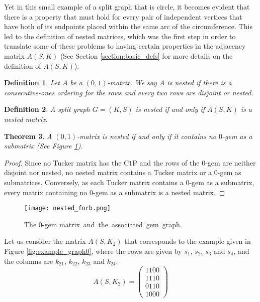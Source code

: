 \documentclass[12pt]{book}
\theoremstyle{plain}
\newtheorem{teo}{Theorem}[chapter]
\newtheorem{defn}[teo]{Definition}
\theoremstyle{remark}
\begin{document}
Yet in this small example of a split graph that is circle, it becomes evident that there is a property that must hold for every pair of independent vertices that have both of its endpoints placed within the same arc of the circumference. This led to the definition of nested matrices, which was the first step in order to translate some of these problems to having certain properties in the adjacency matrix $A(S,K)$ (See Section \ref{section:basic_defs} for more details on the definition of $A(S,K)$). %

\begin{defn} \label{def:nested_m}
	Let $A$ be a $(0,1)$-matrix. We say $A$ is \emph{nested} if there is a consecutive-ones ordering for the rows and every two rows are disjoint or nested.
\end{defn} 

\begin{defn} \label{def:nested_g}
A split graph $G = (K,S)$ is \emph{nested} if and only if $A(S,K)$ is a nested matrix.
\end{defn}

\begin{teo} \label{teo:nested_caract}
A $(0,1)$-matrix is nested if and only if it contains no $0$-gem as a
submatrix (See Figure \ref{fig:forb_nested}).
\end{teo}

\begin{proof}
Since no Tucker matrix has the C$1$P and the rows of the $0$-gem are neither disjoint nor nested, no nested matrix contains a Tucker matrix or a $0$-gem as submatrices. Con\-verse\-ly, as each Tucker matrix contains a $0$-gem as a submatrix, every matrix containing no $0$-gem as a submatrix is a nested matrix.
\end{proof}

\begin{figure}[h!] 
	\centering  
	\texttt{[image: nested\_forb.png]}
	\caption{\mbox{The} $0$-gem \mbox{matrix and the associated gem graph.}} \label{fig:forb_nested}
\end{figure}


Let us consider the matrix $A(S,K_2)$ that corresponds to the example given in Figure \ref{fig:example_graph0}, where the rows are given by $s_1$, $s_2$, $s_3$ and $s_4$, and the columns are $k_{21}$, $k_{22}$, $k_{23}$ and $k_{24}$.
\vspace{-.5mm}
\[
A(S,K_2) = \begin{pmatrix}
	1 1 0 0 \\
	1 1 1 0 \\
	0 1 1 0 \\
	1 0 0 0 
\end{pmatrix}
\]
\end{document}
